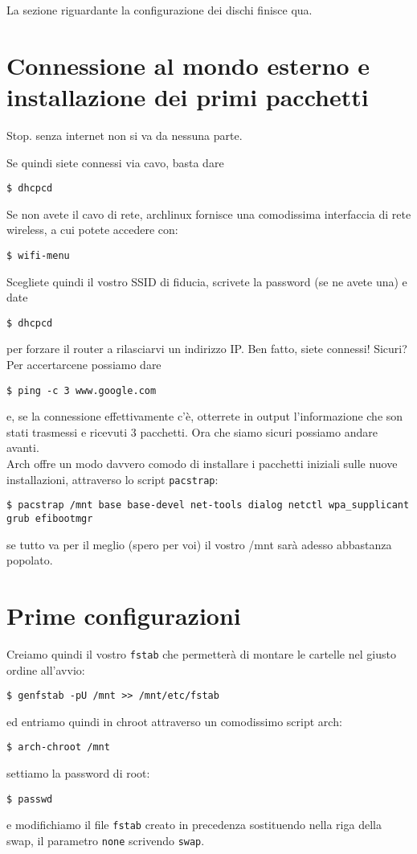 \documentclass[twoside,italian]{book}
\newcommand{\code}[1]{\texttt{#1}}
\begin{document}
    La sezione riguardante la configurazione dei dischi finisce qua.

\section{Connessione al mondo esterno e installazione dei primi pacchetti}

    Stop. senza internet non si va da nessuna parte.

    \medskip \noindent Se quindi siete connessi via cavo, basta dare 
    \begin{lstlisting}
$ dhcpcd
    \end{lstlisting}
    Se non avete il cavo di rete, archlinux fornisce una comodissima interfaccia di rete wireless, a cui potete accedere con:
    \begin{lstlisting}
$ wifi-menu
    \end{lstlisting}
    Scegliete quindi il vostro SSID di fiducia, scrivete la password (se ne avete una) e date \begin{lstlisting}
$ dhcpcd
    \end{lstlisting}
    per forzare il router a rilasciarvi un indirizzo IP. Ben fatto, siete connessi! Sicuri? Per accertarcene possiamo dare 
    \begin{lstlisting}
$ ping -c 3 www.google.com
    \end{lstlisting}
    e, se la connessione effettivamente c'è, otterrete in output l'informazione che son stati trasmessi e ricevuti 3 pacchetti. Ora che siamo sicuri possiamo andare avanti.\\

    Arch offre un modo davvero comodo di installare i pacchetti iniziali sulle nuove installazioni, attraverso lo script \code{pacstrap}:
    \begin{lstlisting}
$ pacstrap /mnt base base-devel net-tools dialog netctl wpa_supplicant grub efibootmgr
    \end{lstlisting}
    se tutto va per il meglio (spero per voi) il vostro /mnt sarà adesso abbastanza popolato.

\section{Prime configurazioni}
    Creiamo quindi il vostro \code{fstab} che permetterà di montare le cartelle nel giusto ordine all'avvio:
    \begin{lstlisting}
$ genfstab -pU /mnt >> /mnt/etc/fstab
    \end{lstlisting}
    ed entriamo quindi in chroot attraverso un comodissimo script arch:
    \begin{lstlisting}
$ arch-chroot /mnt
    \end{lstlisting}
    settiamo la password di root: 
    \begin{lstlisting}
$ passwd
    \end{lstlisting}
    e modifichiamo il file \code{fstab} creato in precedenza sostituendo nella riga della swap, il parametro \code{none} scrivendo \code{swap}.
\end{document}
